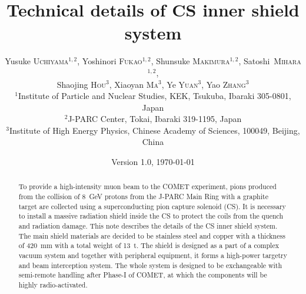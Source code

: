 \documentclass[12pt,a4paper]{article}
\begin{document}
\SetBgHshift{1.6cm}                                   %
\SetBgVshift{5.8cm} 

\title{Technical details of CS inner shield system}
%
\author{Yusuke \textsc{Uchiyama}$^{1,2}$, Yoshinori \textsc{Fukao}$^{1,2}$, Shunsuke \textsc{Makimura}$^{1,2}$, Satoshi~\textsc{Mihara}$^{1,2}$, \\
\vspace{-2mm}
Shaojing \textsc{Hou}$^{3}$, Xiaoyan \textsc{Ma}$^{3}$, Ye \textsc{Yuan}$^{3}$, Yao \textsc{Zhang}$^{3}$\\
\vspace{5mm}
{\footnotesize
$^{1}$Institute of Particle and Nuclear Studies, KEK, Tsukuba, Ibaraki 305-0801, Japan \\
$^{2}$J-PARC Center, Tokai, Ibaraki 319-1195, Japan\\
$^{3}$Institute of High Energy Physics, Chinese Academy of Sciences, 100049, Beijing, China\\}
}
\date{Version 1.0, \today}
\maketitle
\begin{abstract}
To provide a high-intensity muon beam to the COMET experiment,  pions produced from the collision of \SI{8}{\GeV} protons from the J-PARC Main Ring with a graphite target are collected using a superconducting pion capture solenoid (CS). It is necessary to install a massive radiation shield inside the CS to protect the coils from the quench and radiation damage.
This note describes the details of the CS inner shield system.
The main shield materials are decided to be stainless steel and copper with a thickness of \SI{420}{\mm} with a total weight of \SI{13}{\tonne}. 
The shield is designed as a part of a complex vacuum system and
together with peripheral equipment, it forms a high-power targetry and beam interception system.
The whole system is designed to be exchangeable with semi-remote handling after Phase-I of COMET, at which the components will be highly radio-activated.
\end{abstract}
\end{document}
